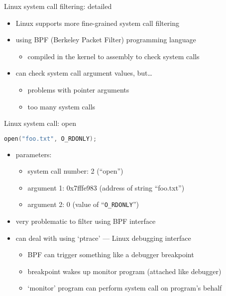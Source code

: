 \begin{frame}{Linux system call filtering: detailed}
    \begin{itemize}
    \item Linux supports more fine-grained system call filtering
    \item using BPF (Berkeley Packet Filter) programming language
        \begin{itemize}
        \item compiled in the kernel to assembly to check system calls
        \end{itemize}
    \vspace{.5cm}
    \item can check system call argument values, but\ldots
        \begin{itemize}
        \item problems with pointer arguments
        \item too many system calls
        \end{itemize}
    \end{itemize}
\end{frame}

\begin{frame}[fragile,label=open]{Linux system call: open}
\begin{lstlisting}[language=C,style=small]
open("foo.txt", O_RDONLY);
\end{lstlisting}
\begin{itemize}
\item parameters:
    \begin{itemize}
    \item system call number: 2 (``open'')
    \item argument 1: 0x7fffe983 (address of string ``foo.txt'')
    \item argument 2: 0 (value of ``\texttt{O\_RDONLY}'')
    \end{itemize}
\item very problematic to filter using BPF interface
\vspace{.5cm}
\item can deal with using `ptrace' --- Linux debugging interface
    \begin{itemize}
    \item BPF can trigger something like a debugger breakpoint
    \item breakpoint wakes up monitor program (attached like debugger)
    \item `monitor' program can perform system call on program's behalf
    \end{itemize}
\end{itemize}
\end{frame}

